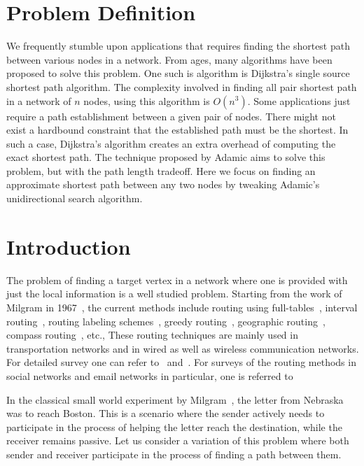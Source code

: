 \documentclass[a4paper,12pt]{article}
\begin{document}
\newpage
\section{Problem Definition}
We frequently stumble upon applications that requires finding the shortest path between various nodes in a network. From ages, many algorithms have been proposed to solve this problem. One such is algorithm is Dijkstra's single source shortest path algorithm. The complexity involved in finding all pair shortest path in a network of $n$ nodes, using this algorithm is $O(n^3)$. Some applications just require a path establishment between a given pair of nodes. There might not exist a hardbound constraint that the established path must be the shortest. In such a case, Dijkstra's algorithm creates an extra overhead of computing the exact shortest path. The technique proposed by Adamic aims to solve this problem, but with the path length tradeoff. Here we focus on finding an approximate shortest path between any two nodes by tweaking Adamic's unidirectional search algorithm.

\section{Introduction}
The problem of finding a target vertex in a network where one is provided with just the local information is a well studied problem. Starting from the work of Milgram in 1967~\cite{milgram67}, the current methods include routing using full-tables~\cite{gavoille01}, interval routing~\cite{gavoille99,gavoille01}, routing labeling schemes~\cite{peleg00,thorup01}, greedy routing~\cite{giordano01,kleinberg-1-00}, geographic routing~\cite{giordano01}, compass routing~\cite{giordano01}, 
etc., These routing techniques are mainly used in transportation networks and in wired as well as wireless communication networks. For detailed survey one can refer to~\cite{gavoille99, gavoille01, giordano01} and~\cite{peleg00}. For surveys of the routing methods in social networks and email networks in particular, one is referred to~\cite{adamic02, adamic01, fraigniaud07, kleinberg-1-00, nowell05} 


%
 
In the classical small world experiment by Milgram~\cite{milgram67}, the letter from Nebraska was to reach Boston. This is a scenario where the sender actively needs to participate in the process of helping the letter reach the destination, while the receiver remains passive. Let us consider a variation of this problem where both sender and receiver participate in the process of finding a path between them. 
\end{document}

